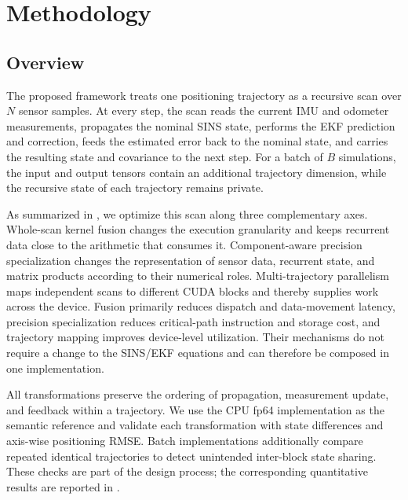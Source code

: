\documentclass[research]{fcs}
\begin{document}
\section{Methodology}
\label{sec:methodology}

\subsection{Overview}
\label{subsec:method-overview}

The proposed framework treats one positioning trajectory as a recursive scan over $N$ sensor samples. At every step, the scan reads the current IMU and odometer measurements, propagates the nominal SINS state, performs the EKF prediction and correction, feeds the estimated error back to the nominal state, and carries the resulting state and covariance to the next step. For a batch of $B$ simulations, the input and output tensors contain an additional trajectory dimension, while the recursive state of each trajectory remains private.

As summarized in , we optimize this scan along three complementary axes. Whole-scan kernel fusion changes the execution granularity and keeps recurrent data close to the arithmetic that consumes it. Component-aware precision specialization changes the representation of sensor data, recurrent state, and matrix products according to their numerical roles. Multi-trajectory parallelism maps independent scans to different CUDA blocks and thereby supplies work across the device. Fusion primarily reduces dispatch and data-movement latency, precision specialization reduces critical-path instruction and storage cost, and trajectory mapping improves device-level utilization. Their mechanisms do not require a change to the SINS/EKF equations and can therefore be composed in one implementation.

All transformations preserve the ordering of propagation, measurement update, and feedback within a trajectory. We use the CPU fp64 implementation as the semantic reference and validate each transformation with state differences and axis-wise positioning RMSE. Batch implementations additionally compare repeated identical trajectories to detect unintended inter-block state sharing. These checks are part of the design process; the corresponding quantitative results are reported in .
\end{document}

